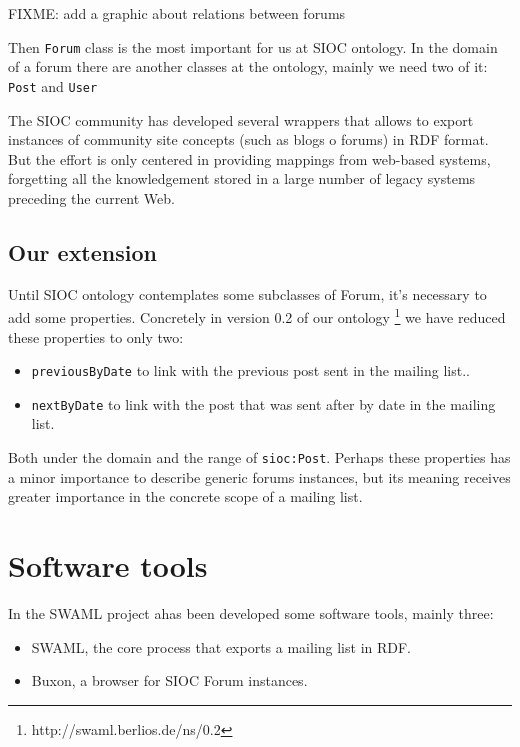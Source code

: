 \documentclass{llncs}
\begin{document}
FIXME: add a graphic about relations between forums

Then \texttt{Forum} class is the most important for us at SIOC ontology. In the 
domain of a forum there are another classes at the ontology, mainly we need two
of it: \texttt{Post} and \texttt{User} 

The SIOC community has developed several wrappers that allows to export instances
of community site concepts (such as blogs o forums) in RDF format. But the effort 
is only centered in providing mappings from web-based systems, forgetting all the 
knowledgement stored in a large number of legacy systems preceding the current Web.

\subsection{Our extension}

Until SIOC ontology contemplates some subclasses of Forum, it's necessary 
to add some properties. Concretely in version 0.2 of our ontology 
\footnote{http://swaml.berlios.de/ns/0.2} we have reduced these properties 
to only two:

\begin{itemize}
  \item \texttt{previousByDate} to link with the previous post sent in the 
	mailing list..
  \item \texttt{nextByDate} to link with the post that was sent after by date 
	in the mailing list.
\end{itemize}

Both under the domain and the range of \texttt{sioc:Post}. Perhaps these 
properties has a minor importance to describe generic forums instances, 
but its meaning receives greater importance in the concrete scope of a 
mailing list.

\section{\label{sec:tools}Software tools}

In the SWAML project ahas been developed some software tools, mainly three:

\begin{itemize}
 \item SWAML, the core process that exports a mailing list in RDF.
 \item Buxon, a browser for SIOC Forum instances.
\end{itemize}
\end{document}
